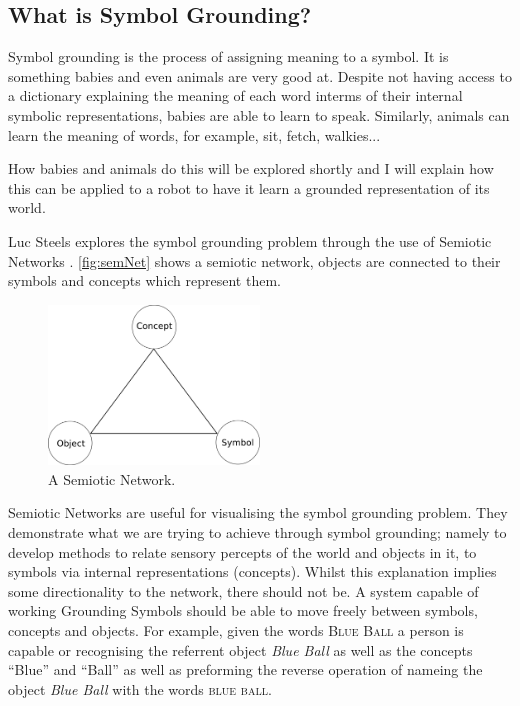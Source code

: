 \subsection{What is Symbol Grounding?}
Symbol grounding is the process of assigning meaning to a symbol. It is something babies and even animals are very good at. Despite not having access to a dictionary explaining the meaning of each word interms of their internal symbolic representations, babies are able to learn to speak. Similarly, animals can learn the meaning of words, for example, sit, fetch, walkies...

How babies and animals do this will be explored shortly and I will explain how this can be applied to a robot to have it learn a grounded representation of its world.

Luc Steels explores the symbol grounding problem through the use of Semiotic Networks \cite{steels2008symbol}. \autoref{fig:semNet} shows a semiotic network, objects are connected to their symbols and concepts which represent them.

\begin{figure}
\centering
\includegraphics[width=0.5\textwidth]{Figs/litReview/semioticNet.png}
\caption{A Semiotic Network.}
\label{fig:semNet}

\end{figure} 

Semiotic Networks are useful for visualising the symbol grounding problem. They demonstrate what we are trying to achieve through symbol grounding; namely to develop methods to relate sensory percepts of the world and objects in it, to symbols via internal representations (concepts). Whilst this explanation implies some directionality to the network, there should not be. A system capable of working Grounding Symbols should be able to move freely between symbols, concepts and objects. For example, given the words \textsc{Blue Ball} a person is capable or recognising the referrent object  \textit{Blue Ball} as well as the concepts ``Blue'' and ``Ball'' as well as preforming the reverse operation of nameing the object \textit{Blue Ball} with the words \textsc{blue ball}.


